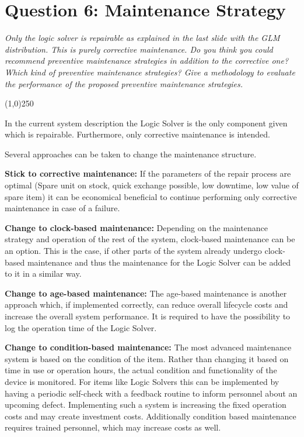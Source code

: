 \section{Question 6: Maintenance Strategy}
\textit{Only the logic solver is repairable	as explained in	the last slide with	the GLM distribution. This is purely corrective	maintenance. Do you think you could recommend preventive maintenance strategies in addition to the corrective one? Which kind of preventive maintenance strategies? Give a methodology to evaluate the performance of the proposed preventive maintenance strategies.}
\begin{center}
\line(1,0){250}
\end{center}
In the current system description the Logic Solver is the only component given which is repairable. Furthermore, only corrective maintenance is intended.

Several approaches can be taken to change the maintenance structure.

\textbf{Stick to corrective maintenance:}
If the parameters of the repair process are optimal (Spare unit on stock, quick exchange possible, low downtime, low value of spare item) it can be economical beneficial to continue performing only corrective maintenance in case of a failure.

\textbf{Change to clock-based maintenance:}
Depending on the maintenance strategy and operation of the rest of the system, clock-based maintenance can be an option. This is the case, if other parts of the system already undergo clock-based maintenance and thus the maintenance for the Logic Solver can be added to it in a similar way.

\textbf{Change to age-based maintenance:}
The age-based maintenance is another approach which, if implemented correctly, can reduce overall lifecycle costs and increase the overall system performance. It is required to have the possibility to log the operation time of the Logic Solver. 

\textbf{Change to condition-based maintenance:}
The most advanced maintenance system is based on the condition of the item. Rather than changing it based on time in use or operation hours, the actual condition and functionality of the device is monitored. For items like Logic Solvers this can be implemented by having a periodic self-check with a feedback routine to inform personnel about an upcoming defect.
Implementing such a system is increasing the fixed operation costs and may create investment costs. Additionally condition based maintenance requires trained personnel, which may increase costs as well.

